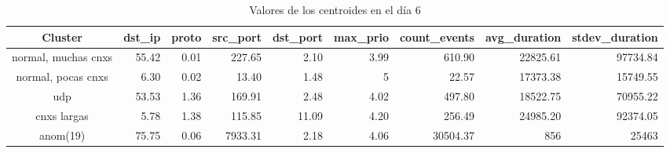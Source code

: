 \begin{table}[h!]
    \begingroup
    \setlength{\tabcolsep}{2pt} %
    \hspace*{-3cm}
    \begin{tabular}{|c|r|r|r|r|r|r|r|r|}
    \hline
    \textbf{Cluster}    & \textbf{dst\_ip} & \textbf{proto} & \textbf{src\_port} & \textbf{dst\_port} & \textbf{max\_prio} & \textbf{count\_events} & \textbf{avg\_duration} & \textbf{stdev\_duration} \\ \hline
    normal, muchas cnxs & 55.42            & 0.01           & 227.65             & 2.10               & 3.99               & 610.90                 & 22825.61               & 97734.84                 \\ \hline
    normal, pocas cnxs  & 6.30             & 0.02           & 13.40              & 1.48               & 5                  & 22.57                  & 17373.38               & 15749.55                 \\ \hline
    udp                 & 53.53            & 1.36           & 169.91             & 2.48               & 4.02               & 497.80                 & 18522.75               & 70955.22                 \\ \hline
    cnxs largas         & 5.78             & 1.38           & 115.85             & 11.09              & 4.20               & 256.49                 & 24985.20               & 92374.05                 \\ \hline
    anom(19)            & 75.75            & 0.06           & 7933.31            & 2.18               & 4.06               & 30504.37               & 856                    & 25463                    \\ \hline
    \end{tabular}
    \endgroup
\caption{Valores de los centroides en el día 6}
\label{tab:dia6}
\end{table}

